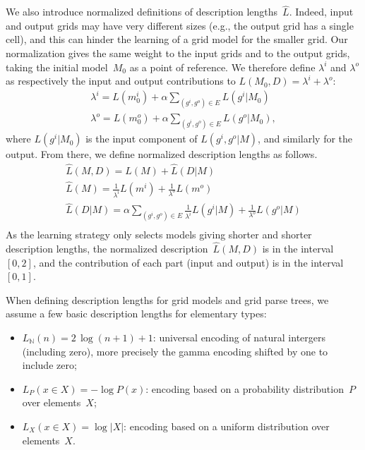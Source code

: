 \documentclass[a4paper]{llncs}
\newcommand{\nat}{\mathbb{N}}
\begin{document}
We also introduce normalized definitions of description
lengths~$\hat{L}$. Indeed, input and output grids may have very
different sizes (e.g., the output grid has a single cell), and this
can hinder the learning of a grid model for the smaller grid. Our
normalization gives the same weight to the input grids and to the
output grids, taking the initial model~$M_0$ as a point of reference.
We therefore define $\lambda^i$ and $\lambda^o$ as respectively the
input and output contributions to $L(M_0,D) = \lambda^i + \lambda^o$:
\begin{align*}
    \lambda^i = L(m^i_0) + \alpha \sum_{(g^i,g^o) \in E} L(g^i|M_0) \\
    \lambda^o = L(m^o_0) + \alpha \sum_{(g^i,g^o) \in E} L(g^o|M_0),
\end{align*}
where $L(g^i|M_0)$ is the input component of $L(g^i,g^o|M)$, and
similarly for the output.  From there, we define normalized
description lengths as follows.
\begin{align*}
  \hat{L}(M,D) = \hat{L}(M) + \hat{L}(D|M) \\
  \hat{L}(M) = \frac{1}{\lambda^i}L(m^i) + \frac{1}{\lambda^o}L(m^o) \\
  \hat{L}(D|M) = \alpha \sum_{(g^i,g^o) \in E} \frac{1}{\lambda^i}L(g^i|M) + \frac{1}{\lambda^o}L(g^o|M) \\
\end{align*}
As the learning strategy only selects models giving shorter and shorter description lengths, the normalized description~$\hat{L}(M,D)$ is in the interval~$[0,2]$, and the contribution of each part (input and output) is in the interval~$[0,1]$.

When defining description lengths for grid models and grid parse
trees, we assume a few basic description lengths for elementary types:
\begin{itemize}
\item $L_\nat(n) = 2\,\log (n+1) + 1$: universal encoding of natural
  intergers (including zero), more precisely the gamma encoding
  shifted by one to include zero;
\item $L_P(x \in X) = -\log P(x)$: encoding based on a probability distribution~$P$ over elements~$X$;
\item $L_X(x \in X) = \log |X|$: encoding based on a uniform distribution over elements~$X$.
\end{itemize}
\end{document}
